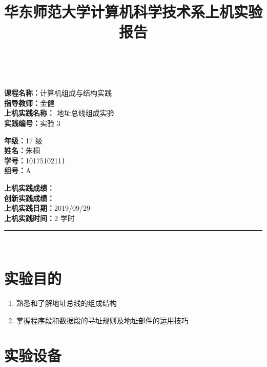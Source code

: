 \documentclass[a4paper,10pt,UTF8]{paper}
\title{华东师范大学计算机科学技术系上机实验报告}
\numberwithin{equation}{section}
\numberwithin{figure}{section}
\begin{document}
\pagestyle{fancy}
\lhead{}
\rhead{}
\makeatletter
\def\headrule{{\if@fancyplain\let\headrulewidth\plainheadrulewidth\fi%
\color{gray}\hrule\@height 0.2pt\@width\headwidth}
  \vspace{6mm}}
\makeatother

\newcommand{\HRule}{\rule{\linewidth}{1mm}}
\newcommand{\dai}{\textbf{Dais-CMX16$^+$}}

{ \\ [0.8cm]

\small{
  \begin{minipage}[t]{.32\linewidth}
    \textbf{课程名称：}计算机组成与结构实践\\
    \textbf{指导教师：}金健\\
    \textbf{上机实践名称：} 地址总线组成实验\\
    \textbf{实践编号：}实验 3
  \end{minipage}
  \begin{minipage}[t]{.32\linewidth}
    \textbf{年级：}17 级\\
    \textbf{姓名：}朱桐\\
    \textbf{学号：}10175102111\\
    \textbf{组号：}A
  \end{minipage} 
  \begin{minipage}[t]{.32\linewidth}
    \textbf{上机实践成绩：} \\
    \textbf{创新实践成绩：} \\
    \textbf{上机实践日期：}2019/09/29\\
    \textbf{上机实践时间：}2 学时\\
  \end{minipage}
}
\HRule \\[0.5cm]
}
\section{实验目的}

\begin{enumerate}
    \item 熟悉和了解地址总线的组成结构
    \item 掌握程序段和数据段的寻址规则及地址部件的运用技巧
    
\end{enumerate}

\section{实验设备}
\end{document}
